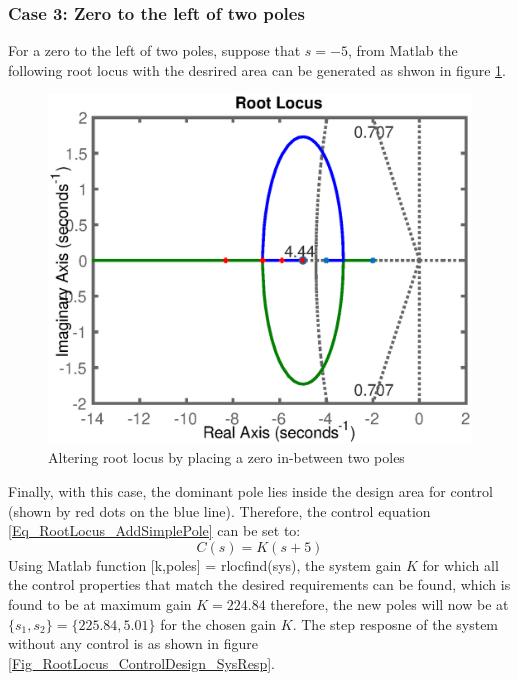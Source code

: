 \subsubsection{Case 3: Zero to the left of two poles}
For a zero to the left of two poles, suppose that $s = -5$, from Matlab the following root locus with the desrired area can be generated as shwon in figure \ref{Fig_RootLocus_ControlDesign_PD3}.
\begin{figure}[h!]
	\centering
	\includegraphics[width=\linewidth]{Bilder/RootLocus_ControlDesign_PD3.eps}
	\caption{Altering root locus by placing a zero in-between two poles}
	\label{Fig_RootLocus_ControlDesign_PD3}
\end{figure}
\newpage
Finally, with this case, the dominant pole lies inside the design area for control (shown by red dots on the blue line). Therefore, the control equation \eqref{Eq_RootLocus_AddSimplePole} can be set to:
\begin{equation}
	C(s) = K(s + 5)
\end{equation}
Using Matlab function [k,poles] = rlocfind(sys), the system gain $K$ for which all the control properties that match the desired requirements can be found, which is found to be at maximum gain $K = 224.84$ therefore, the new poles will now be at $\{s_1,s_2\} = \{225.84, 5.01\}$ for the chosen gain $K$. The step resposne of the system without any control is as shown in figure \ref{Fig_RootLocus_ControlDesign_SysResp}.
